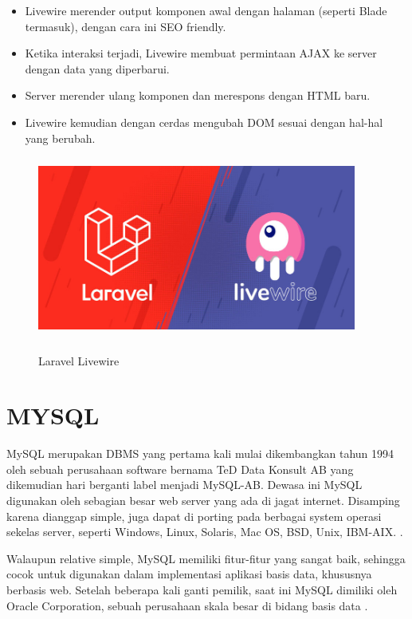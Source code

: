 \begin{itemize}
	\item Livewire merender output komponen awal dengan halaman (seperti Blade termasuk), dengan cara ini SEO friendly.
	\item Ketika interaksi terjadi, Livewire membuat permintaan AJAX ke server dengan data yang diperbarui.
	\item Server merender ulang komponen dan merespons dengan HTML baru.
	\item Livewire kemudian dengan cerdas mengubah DOM sesuai dengan hal-hal yang berubah.
\end{itemize}

\begin{figure}[H]
\centering
{\includegraphics [width = 10.5cm, height= 6cm]{gambar/laravel-livewire}}
\caption{Laravel Livewire}
\label{laravel_livewire}
\end{figure}

\section{\uppercase{MySQL}}
MySQL merupakan DBMS yang pertama kali mulai dikembangkan tahun 1994 oleh sebuah perusahaan software bernama TeD Data Konsult AB yang dikemudian hari berganti label menjadi MySQL-AB. Dewasa ini MySQL digunakan oleh sebagian besar web server yang ada di jagat internet. Disamping karena dianggap simple, juga dapat di porting pada berbagai system operasi sekelas server, seperti Windows, Linux, Solaris, Mac OS, BSD, Unix, IBM-AIX. \citep{fathansyah2012}.

\par Walaupun relative simple, MySQL memiliki fitur-fitur yang sangat baik, sehingga cocok untuk digunakan dalam implementasi aplikasi basis data, khususnya berbasis web. Setelah beberapa kali ganti pemilik, saat ini MySQL dimiliki oleh Oracle Corporation, sebuah perusahaan skala besar di bidang basis data \citep{fathansyah2012}.

